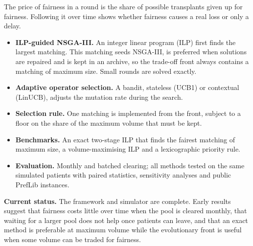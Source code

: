\documentclass[10pt]{article}
\begin{document}
The price of fairness in a round is the share of possible transplants given up for
fairness. Following it over time shows whether fairness causes a real loss or only a
delay.

\begin{itemize}
  \item \textbf{ILP-guided NSGA-III.} An integer linear program (ILP) first finds the
        largest matching. This matching seeds NSGA-III, is preferred when solutions are
        repaired and is kept in an archive, so the trade-off front always contains a
        matching of maximum size. Small rounds are solved exactly.
  \item \textbf{Adaptive operator selection.} A bandit, stateless (UCB1) or contextual
        (LinUCB), adjusts the mutation rate during the search.
  \item \textbf{Selection rule.} One matching is implemented from the front, subject to
        a floor on the share of the maximum volume that must be kept.
  \item \textbf{Benchmarks.} An exact two-stage ILP that finds the fairest matching of
        maximum size, a volume-maximising ILP and a lexicographic priority rule.
  \item \textbf{Evaluation.} Monthly and batched clearing; all methods tested on the
        same simulated patients with paired statistics, sensitivity analyses and public
        PrefLib instances.
\end{itemize}

\textbf{Current status.} The framework and simulator are complete. Early results
suggest that fairness costs little over time when the pool is cleared monthly, that
waiting for a larger pool does not help once patients can leave, and that an exact
method is preferable at maximum volume while the evolutionary front is useful when some
volume can be traded for fairness.
\end{document}
